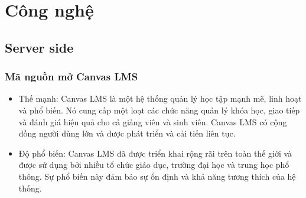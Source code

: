 \documentclass[../Thesis.tex]{subfiles}
\begin{document}
\section{Công nghệ}
	\subsection{Server side}
		\subsubsection{Mã nguồn mở Canvas LMS}
			\begin{itemize}
				\item Thế mạnh: Canvas LMS là một hệ thống quản lý học tập mạnh mẽ, linh hoạt và phổ biến. Nó cung cấp một loạt các chức năng quản lý khóa học, giao tiếp và đánh giá hiệu quả cho cả giảng viên và sinh viên. Canvas LMS có cộng đồng người dùng lớn và được phát triển và cải tiến liên tục.
				\item Độ phổ biến: Canvas LMS đã được triển khai rộng rãi trên toàn thế giới và được sử dụng bởi nhiều tổ chức giáo dục, trường đại học và trung học phổ thông. Sự phổ biến này đảm bảo sự ổn định và khả năng tương thích của hệ thống.
			\end{itemize}
\end{document}
